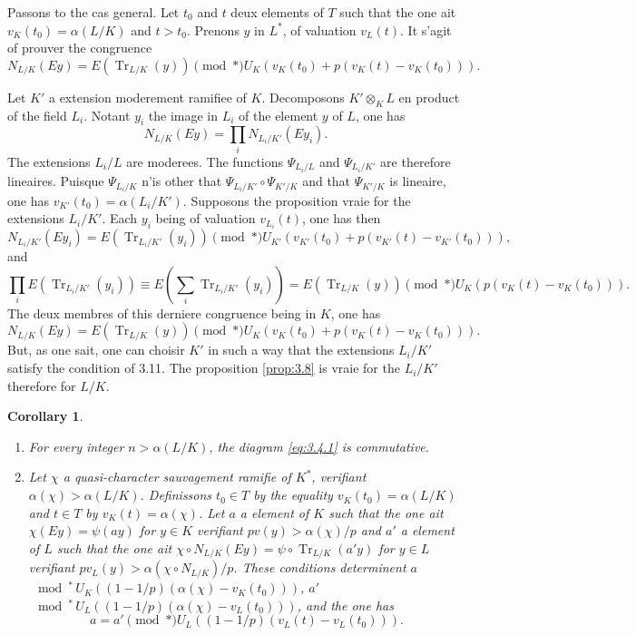 \documentclass[12pt,a4paper]{article}
\theoremstyle{plain}
\newtheorem{corollary}[theorem]{Corollary}
\theoremstyle{definition}
\theoremstyle{remark}
\DeclareMathOperator{\Tr}{Tr}
\providecommand{\Tr}{\operatorname{Tr}}
\begin{document}
Passons to the cas general. Let $t_0$ and $t$ deux elements of $T$ such that the one ait $v_K(t_0) = \alpha(L/K)$ and $t > t_0$. Prenons $y$ in $L^*$, of valuation $v_L(t)$. It s'agit of prouver the congruence
\[
N_{L/K}(Ey) = E(\Tr_{L/K}(y)) \pmod{*} U_K(v_K(t_0) + p(v_K(t) - v_K(t_0))).
\]

Let $K'$ a extension moderement ramifiee of $K$. Decomposons $K' \otimes_K L$ en product of the field $L_i$. Notant $y_i$ the image in $L_i$ of the element $y$ of $L$, one has
\[
N_{L/K}(Ey) = \prod_i N_{L_i/K'}(Ey_i).
\]
The extensions $L_i/L$ are moderees. The functions $\Psi_{L_i/L}$ and $\Psi_{L_i/K'}$ are therefore lineaires. Puisque $\Psi_{L_i/K}$ n'is other that $\Psi_{L_i/K'} \circ \Psi_{K'/K}$ and that $\Psi_{K'/K}$ is lineaire, one has $v_{K'}(t_0) = \alpha(L_i/K')$. Supposons the proposition vraie for the extensions $L_i/K'$. Each $y_i$ being of valuation $v_{L_i}(t)$, one has then
\[
N_{L_i/K'}(Ey_i) = E(\Tr_{L_i/K'}(y_i)) \pmod{*} U_{K'}(v_{K'}(t_0) + p(v_{K'}(t) - v_{K'}(t_0))),
\]
and
\[
\prod_i E(\Tr_{L_i/K'}(y_i)) \equiv E(\sum_i \Tr_{L_i/K'}(y_i)) = E(\Tr_{L/K}(y)) \pmod{*} U_K(p(v_K(t) - v_K(t_0))).
\]
The deux membres of this derniere congruence being in $K$, one has
\[
N_{L/K}(Ey) = E(\Tr_{L/K}(y)) \pmod{*} U_K(v_K(t_0) + p(v_K(t) - v_K(t_0))).
\]
But, as one sait, one can choisir $K'$ in such a way that the extensions $L_i/K'$ satisfy the condition of 3.11. The proposition \ref{prop:3.8} is vraie for the $L_i/K'$ therefore for $L/K$.

\begin{corollary}\label{cor:3.12}
\begin{enumerate}[label=(\roman*)]
\item For every integer $n > \alpha(L/K)$, the diagram \eqref{eq:3.4.1} is commutative.
\item Let $\chi$ a quasi-character sauvagement ramifie of $K^*$, verifiant $\alpha(\chi) > \alpha(L/K)$. Definissons $t_0 \in T$ by the equality $v_K(t_0) = \alpha(L/K)$ and $t \in T$ by $v_K(t) = \alpha(\chi)$. Let $a$ a element of $K$ such that the one ait $\chi(Ey) = \psi(ay)$ for $y \in K$ verifiant $pv(y) > \alpha(\chi)/p$ and $a'$ a element of $L$ such that the one ait $\chi \circ N_{L/K}(Ey) = \psi \circ \Tr_{L/K}(a'y)$ for $y \in L$ verifiant $pv_L(y) > \alpha(\chi \circ N_{L/K})/p$. These conditions determinent $a$ $\mod^*\, U_K((1-1/p)(\alpha(\chi) - v_K(t_0)))$, $a'$ $\mod^*\, U_L((1-1/p)(\alpha(\chi) - v_L(t_0)))$, and the one has
\[
a = a' \pmod{*} U_L((1-1/p)(v_L(t) - v_L(t_0))).
\]
\end{enumerate}
\end{corollary}
\end{document}

